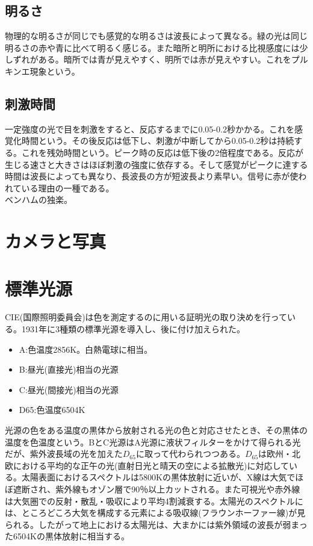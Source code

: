 \documentclass{jsarticle}
\begin{document}
		\subsection{明るさ}
			物理的な明るさが同じでも感覚的な明るさは波長によって異なる。緑の光は同じ明るさの赤や青に比べて明るく感じる。また暗所と明所における比視感度には少しずれがある。暗所では青が見えやすく、明所では赤が見えやすい。これをプルキンエ現象という。
		\subsection{刺激時間}
			一定強度の光で目を刺激をすると、反応するまでに0.05-0.2秒かかる。これを感覚化時間という。その後反応は低下し、刺激が中断してから0.05-0.2秒は持続する。これを残効時間という。ピーク時の反応は低下後の2倍程度である。反応が生じる速さと大きさはほぼ刺激の強度に依存する。そして感覚がピークに達する時間は波長によっても異なり、長波長の方が短波長より素早い。信号に赤が使われている理由の一種である。\\
			ベンハムの独楽。
	\section{カメラと写真}

	\section{標準光源}
		CIE(国際照明委員会)は色を測定するのに用いる証明光の取り決めを行っている。1931年に3種類の標準光源を導入し、後に付け加えられた。
		\begin{itemize}
			\item A:色温度2856K。白熱電球に相当。
			\item B:昼光(直接光)相当の光源
			\item C:昼光(間接光)相当の光源
			\item D65:色温度6504K
		\end{itemize}
		光源の色をある温度の黒体から放射される光の色と対応させたとき、その黒体の温度を色温度という。BとC光源はA光源に液状フィルターをかけて得られる光だが、紫外波長域の光を加えた$D_{65}$に取って代わられつつある。$D_{65}$は欧州・北欧における平均的な正午の光(直射日光と晴天の空による拡散光)に対応している。太陽表面におけるスペクトルは5800Kの黒体放射に近いが、X線は大気でほぼ遮断され、紫外線もオゾン層で90％以上カットされる。また可視光や赤外線は大気圏での反射・散乱・吸収により平均4割減衰する。太陽光のスペクトルには、ところどころ大気を構成する元素による吸収線(フラウンホーファー線)が見られる。したがって地上における太陽光は、大まかには紫外領域の波長が弱まった6504Kの黒体放射に相当する。
\end{document}
